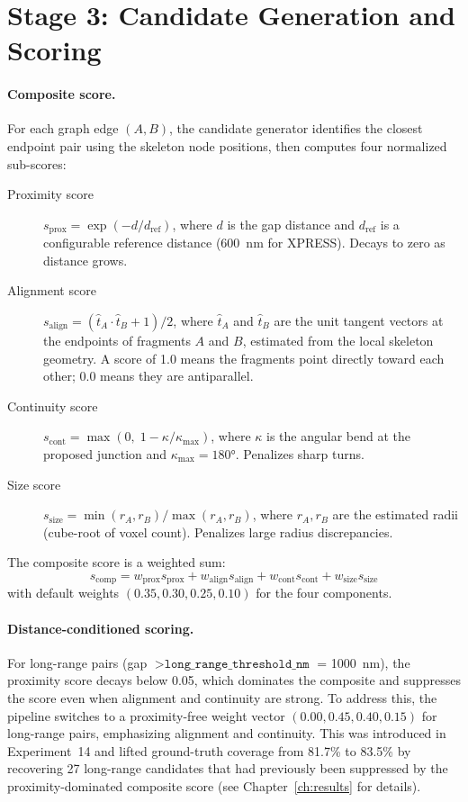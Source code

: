 \section{Stage 3: Candidate Generation and Scoring}

\paragraph{Composite score.}
For each graph edge $(A, B)$, the candidate generator identifies the closest
endpoint pair using the skeleton node positions, then computes four normalized
sub-scores:

\begin{description}
  \item[Proximity score] $s_\text{prox} = \exp(-d / d_\text{ref})$, where $d$
        is the gap distance and $d_\text{ref}$ is a configurable reference
        distance (600~nm for XPRESS). Decays to zero as distance grows.

  \item[Alignment score] $s_\text{align} = (\hat{t}_A \cdot \hat{t}_B + 1) / 2$,
        where $\hat{t}_A$ and $\hat{t}_B$ are the unit tangent vectors at the
        endpoints of fragments $A$ and $B$, estimated from the local skeleton
        geometry. A score of 1.0 means the fragments point directly toward each
        other; 0.0 means they are antiparallel.

  \item[Continuity score] $s_\text{cont} = \max(0,\; 1 - \kappa / \kappa_\text{max})$,
        where $\kappa$ is the angular bend at the proposed junction and
        $\kappa_\text{max} = 180°$. Penalizes sharp turns.

  \item[Size score] $s_\text{size} = \min(r_A, r_B) / \max(r_A, r_B)$, where
        $r_A, r_B$ are the estimated radii (cube-root of voxel count). Penalizes
        large radius discrepancies.
\end{description}

The composite score is a weighted sum:
\begin{equation}
  s_\text{comp} = w_\text{prox} s_\text{prox} + w_\text{align} s_\text{align}
                + w_\text{cont} s_\text{cont} + w_\text{size} s_\text{size}
\end{equation}
with default weights $(0.35, 0.30, 0.25, 0.10)$ for the four components.

\paragraph{Distance-conditioned scoring.}
For long-range pairs (gap $> \texttt{long\_range\_threshold\_nm}$ = 1000~nm),
the proximity score decays below 0.05, which dominates the composite and
suppresses the score even when alignment and continuity are strong. To address
this, the pipeline switches to a proximity-free weight vector
$(0.00, 0.45, 0.40, 0.15)$ for long-range pairs, emphasizing alignment and
continuity. This was introduced in Experiment~14 and lifted ground-truth
coverage from 81.7\% to 83.5\% by recovering 27 long-range candidates that
had previously been suppressed by the proximity-dominated composite score
(see Chapter~\ref{ch:results} for details).

